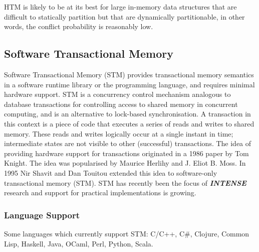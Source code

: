 \documentclass[a4paper,oneside]{report}
\begin{document}
HTM is likely to be at its best for large in-memory data structures that are difficult to statically partition but that are dynamically partitionable, in other words, the conflict probability is reasonably low. 
  	
  	\subsection{Software Transactional Memory}
  	
  	Software Transactional Memory (STM) provides transactional memory semantics in a software runtime library or the programming language, and requires minimal hardware support. STM is a concurrency control mechanism analogous to database transactions for controlling access to shared memory in concurrent computing, and is an alternative to lock-based synchronisation. A transaction in this context is a piece of code that executes a series of reads and writes to shared memory. These reads and writes logically occur at a single instant in time; intermediate states are not visible to other (successful) transactions. The idea of providing hardware support for transactions originated in a 1986 paper by Tom Knight. The idea was popularised by Maurice Herlihy and J. Eliot B. Moss. In 1995 Nir Shavit and Dan Touitou extended this idea to software-only transactional memory (STM). STM has recently been the focus of \textbf{\emph{INTENSE}} research and support for practical implementations is growing.
  	
  	\subsubsection{Language Support}
  	Some languages which currently support STM: 
  	C/C++, C#, Clojure, Common Lisp, Haskell, Java, OCaml, Perl, Python, Scala.
\end{document}
